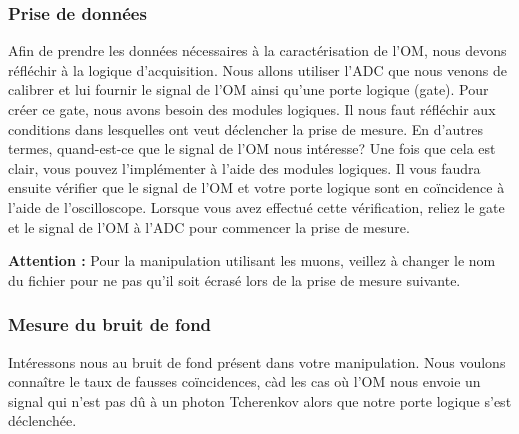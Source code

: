 \subsubsection{Prise de données}

Afin de prendre les données nécessaires à la caractérisation de l'OM, nous devons réfléchir à la logique d'acquisition. Nous allons utiliser l'ADC que nous venons de calibrer et lui fournir le signal de l'OM ainsi qu'une porte logique (gate). Pour créer ce gate, nous avons besoin des modules logiques. Il nous faut réfléchir aux conditions dans lesquelles ont veut déclencher la prise de mesure. En d'autres termes, quand-est-ce que le signal de l'OM nous intéresse? Une fois que cela est clair, vous pouvez l'implémenter à l'aide des modules logiques. Il vous faudra ensuite vérifier que le signal de l'OM et votre porte logique sont en coïncidence à l'aide de l'oscilloscope. Lorsque vous avez effectué cette vérification, reliez le gate et le signal de l'OM à l'ADC pour commencer la prise de mesure.

\textbf{Attention :} Pour la manipulation utilisant les muons, veillez à changer le nom du fichier pour ne pas qu'il soit écrasé lors de la prise de mesure suivante.


\subsubsection{Mesure du bruit de fond}

Intéressons nous au bruit de fond présent dans votre manipulation. Nous voulons connaître le taux de fausses coïncidences, càd les cas où l'OM nous envoie un signal qui n'est pas dû à un photon Tcherenkov alors que notre porte logique s'est déclenchée.

